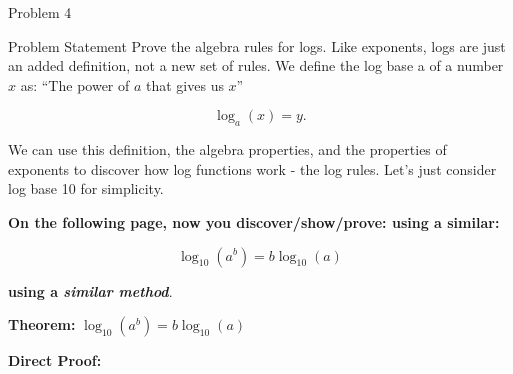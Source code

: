 \begin{problem}{Problem 4}
    \begin{statement}{Problem Statement}
        Prove the algebra rules for logs. Like exponents, logs are just an added definition, not a new set of rules.  We define the log base a of a number $x$ as:  “The power of $a$ that gives us $x$”

        \begin{equation*}
            \log_{a}{(x)} = y.
        \end{equation*}

        We can use this definition, the algebra properties, and the properties of exponents to discover how log functions work - the log rules. Let’s just consider log base 10 for simplicity. \vspace*{1em}

        \textbf{On the following page, now you discover/show/prove: using a similar:}
        
        \begin{equation*}
            \log_{10}({a^{b}}) = b \log_{10}{(a)}
        \end{equation*}
        
        \textbf{using a \textit{similar method}}.
    \end{statement}

    \begin{Highlight}[Solution]
        \textbf{Theorem:} $\log_{10}{(a^{b})} = b \log_{10}{(a)}$ \vspace*{1em}

        \textbf{Direct Proof:} \vspace*{1em}


\end{Highlight}
\end{problem}
